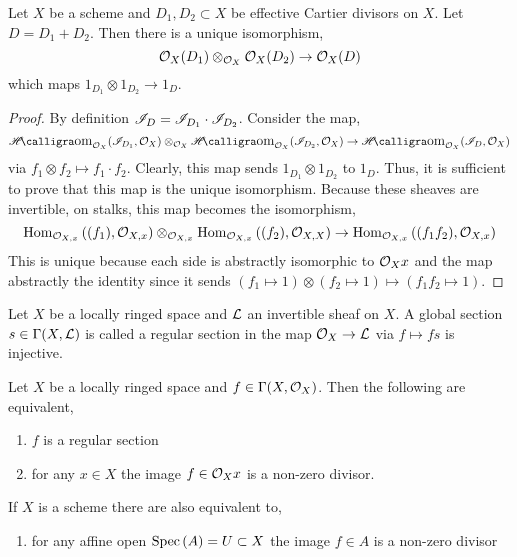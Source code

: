 \documentclass[12pt]{article}
\begin{document}
\begin{lemma}
Let $X$ be a scheme and $D_1, D_2 \subset X$ be effective Cartier divisors on $X$. Let $D = D_1 + D_2$. Then there is a unique isomorphism,
\[ \mathcal{O}_{X}(D_1) \otimes_{\mathcal{O}_{X}} \mathcal{O}_{X}(D_2) \to \mathcal{O}_{X}(D) \]
which maps $1_{D_1} \otimes 1_{D_2} \to 1_D$.
\end{lemma}

\begin{proof}
By definition $\mathscr{I}_D = \mathscr{I}_{D_1} \cdot \mathscr{I}_{D_2}$. Consider the map,
\[ \shHomover{\struct{X}}{\I_{D_1}}{\struct{X}} \otimes_{\struct{X}} \shHomover{\struct{X}}{\I_{D_2}}{\struct{X}} \to \shHomover{\struct{X}}{\I_{D}}{\struct{X}} \]
via $f_1 \otimes f_2 \mapsto f_1 \cdot f_2$. Clearly, this map sends $1_{D_1} \otimes 1_{D_2}$ to $1_D$. Thus, it is sufficient to prove that this map is the unique isomorphism. Because these sheaves are invertible, on stalks, this map becomes the isomorphism,
\[ \mathrm{Hom}_{\mathcal{O}_{X, x}} \left( (f_1), \mathcal{O}_{X, x} \right) \otimes_{\mathcal{O}_{X, x}} \mathrm{Hom}_{\mathcal{O}_{X, x}} \left( (f_2), \mathcal{O}_{X, X} \right) \to \mathrm{Hom}_{\mathcal{O}_{X, x}} \left( (f_1 f_2), \mathcal{O}_{X, x} \right) \]
This is unique because each side is abstractly isomorphic to $\mathcal{O}_{X}{x}$ and the map abstractly the identity since it sends $(f_1 \mapsto 1) \otimes (f_2 \mapsto 1) \mapsto (f_1 f_2 \mapsto 1)$. 
\end{proof}

\begin{definition}
Let $X$ be a locally ringed space and $\mathcal{L}$ an invertible sheaf on $X$. A global section $s \in \Gamma(X, \mathcal{L})$ is called a regular section in the map $\mathcal{O}_{X} \to \mathcal{L}$ via $f \mapsto fs$ is injective.
\end{definition}

\begin{lemma}
Let $X$ be a locally ringed space and $f \in \Gamma(X, \mathcal{O}_{X})$. Then the following are equivalent,
\begin{enumerate}
\item $f$ is a regular section 
\item for any $x \in X$ the image $f \in \mathcal{O}_{X}{x}$ is a non-zero divisor.
\end{enumerate}
If $X$ is a scheme there are also equivalent to,
\begin{enumerate}
\item for any affine open $\mathrm{Spec}\left( A \right) = U \subset X$ the image $f \in A$ is a non-zero divisor
\end{enumerate}
\end{lemma}
\end{document}
